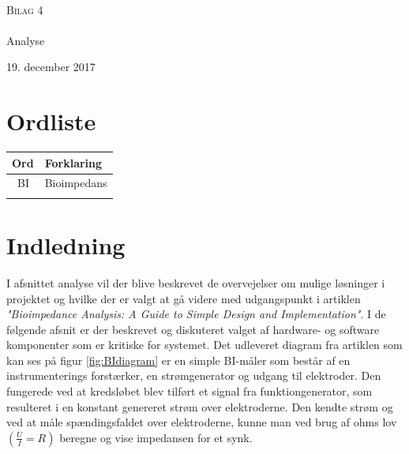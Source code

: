 



\begin{titlingpage}
\begin{center}

~ \\[3cm]


\textsc{\LARGE Bilag 4}\\[1.5cm]


\noindent\makebox[\linewidth]{\rule{\textwidth}{0.4pt}}\\
[0.5cm]{\Huge Analyse}
\noindent\makebox[\linewidth]{\rule{\textwidth}{0.4pt}}
\end{center}
\vfill
\begin{center}
{\large 19. december 2017}
\end{center}
\end{titlingpage}



\newpage
\tableofcontents*
\newpage
\chapter{Ordliste}

\begin{longtabu} to 
    Ord &    Forklaring\\
    \toprule \
   BI 	&    Bioimpedans \\
    
 
\label{forkort}
\end{longtabu}

\chapter{Indledning}

I afsnittet analyse vil der blive beskrevet de overvejelser om mulige løsninger i projektet og hvilke der er valgt at gå videre med udgangspunkt i artiklen \textit{"Bioimpedance Analysis: A Guide to Simple Design and Implementation"}. I de følgende afsnit er der beskrevet og diskuteret valget af hardware- og software komponenter som er kritiske for systemet. Det udleveret diagram fra artiklen som kan ses på figur \ref{fig:BIdiagram} er en simple BI-måler som består af en instrumenterings forstærker, en strømgenerator og udgang til elektroder. Den fungerede ved at kredsløbet blev tilført et signal fra funktiongenerator, som resulteret i en konstant genereret strøm over elektroderne. Den kendte strøm og ved at måle spændingsfaldet over elektroderne, kunne man ved brug af ohms lov $(\frac{U}{I}=R)$ beregne og vise impedansen for et synk.

